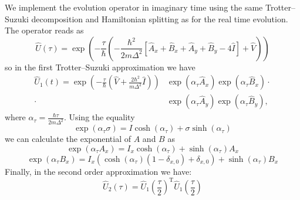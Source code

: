 We implement the evolution operator in imaginary time using the same Trotter--Suzuki decomposition and Hamiltonian splitting as for the real time evolution. The operator reads as
\begin{equation}
\hat{U}(\tau) =   \exp\left(-\frac{\tau}{\hbar} \left( -\frac{\hbar^2}{2 m \Delta^2} \left[ \hat{A}_x + \hat{B}_x + \hat{A}_y + \hat{B}_y - 4 \hat{I} \right] + \hat{V} \right) \right)
\end{equation} 
so in the first Trotter--Suzuki approximation we have
\begin{align}
\hat{U}_1(t) = \exp\left(-\frac{\tau}{\hbar}\left(\hat{V} + \frac{2 \hbar^2}{m \Delta^2} \hat{I}\right) \right) & \exp\left(\alpha_\tau \hat{A}_x \right) \exp\left( \alpha_\tau \hat{B}_x \right) \cdot \\ \cdot & \exp\left( \alpha_\tau \hat{A}_y \right) \exp\left( \alpha_\tau \hat{B}_y \right), \nonumber
\end{align}
where $\alpha_\tau = \frac{\hbar \tau}{2m\Delta^2}$. Using the equality
\begin{equation}
\exp( \alpha_\tau \sigma) = I \cosh(\alpha_\tau) +  \sigma \sinh(\alpha_\tau)
\end{equation}
we can calculate the exponential of $A$ and $B$ as
\begin{equation}
\exp\left( \alpha_\tau A_x \right) = I_x \cosh(\alpha_\tau) + \sinh(\alpha_\tau) A_x
\end{equation}
\begin{equation}
\exp\left( \alpha_\tau B_x \right) = I_x (\cosh(\alpha_\tau)(1-\delta_{x,0}) + \delta_{x,0}) +  \sinh(\alpha_\tau) B_x
\end{equation}
Finally, in the second order approximation we have:
\begin{equation}
\hat{U}_2(\tau) = \hat{U}_1\left( \frac{\tau}{2} \right)^\mathrm{T} \hat{U}_1\left(\frac{\tau}{2}\right)
\end{equation}

